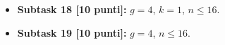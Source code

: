 \begin{itemize}
    \item \textbf{Subtask 18 [10 punti]:} $g=4$, $k=1$, $n \le 16$.
    \item \textbf{Subtask 19 [10 punti]:} $g=4$, $n \le 16$.
      
  \end{itemize}
  
